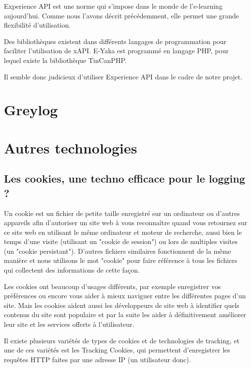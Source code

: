             Experience API est une norme qui s’impose dans le monde de l’e-learning aujourd’hui. Comme nous l’avons décrit précédemment, elle permet une grande flexibilité d’utilisation.

            Des bibliothèques existent dans différents langages de programmation pour faciliter l’utilisation de xAPI. E-Yaka est programmé en langage PHP, pour lequel existe la bibliothèque TinCanPHP.

            Il semble donc judicieux d’utiliser Experience API dans le cadre de notre projet.


    \section{Greylog  }
    
    \section{Autres technologies}
    
    \subsection{Les cookies, une techno efficace pour le logging ?}
    
    Un cookie est un fichier de petite taille enregistré sur un ordinateur ou d'autres appareils afin d'autoriser un site web à vous reconnaître quand vous retournez sur ce site web en utilisant le même ordinateur et moteur de recherche, aussi bien le temps d'une visite (utilisant un "cookie de session") ou lors de multiples visites (un "cookie persistant"). D'autres fichiers similaires fonctionnent de la même manière et nous utilisons le mot "cookie" pour faire référence à tous les fichiers qui collectent des informations de cette façon.
    
    Les cookies ont beaucoup d'usages différents, par exemple enregistrer vos préférences ou encore vous aider à mieux naviguer entre les différentes pages d'un site. Mais les cookies aident aussi les développeurs de site web à identifier quels contenus du site sont populaire et par la suite les aider à définitivement améliorer leur site et les services offerts à l'utilisateur.
    
    Il existe plusieurs variétés de types de cookies et de technologies de tracking, et une de ces variétés est les Tracking Cookies, qui permettent d'enregistrer les requêtes HTTP faites par une adresse IP (un utilisateur donc). 
    
